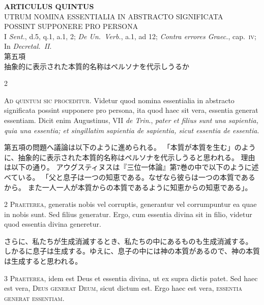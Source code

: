 \documentclass[paper=a4paper,fontsize=10pt,jafontsize=9pt,titlepage]{jlreq}
\begin{document}
\begin{center}
 {\Large {\bfseries ARTICULUS QUINTUS}}\\
 {\large UTRUM NOMINA ESSENTIALIA IN ABSTRACTO SIGNIFICATA\\POSSINT SUPPONERE PRO PERSONA}\\
 {\footnotesize I \textit{Sent.}, d.5, q.1, a.1, 2; \textit{De Un.~Verb.}, a.1, ad 12; \textit{Contra errores Graec.}, cap.~\textsc{iv}; In \textit{Decretal.~II}.}\\
 {\Large 第五項\\抽象的に表示された本質的名称はペルソナを代示しうるか}
\end{center}

\begin{paracol}{2}

\textsc{Ad quintum sic proceditur}. Videtur quod nomina essentialia in
abstracto significata possint supponere pro persona, ita quod haec sit vera,
essentia generat essentiam. Dicit enim Augustinus, VII \textit{de Trin}., \textit{pater et
filius sunt una sapientia, quia una essentia; et singillatim sapientia de
sapientia, sicut essentia de essentia}.

\switchcolumn

第五項の問題へ議論は以下のように進められる。
「本質が本質を生む」のように、抽象的に表示された本質的名称はペルソナを代示しうると思われる。
理由は以下の通り。
アウグスティヌスは『三位一体論』第7巻の中で以下のように述べている。
「父と息子は一つの知恵である。なぜなら彼らは一つの本質であるから。
また一人一人が本質からの本質であるように知恵からの知恵である」。

\switchcolumn*

2 \textsc{Praeterea}, generatis nobis vel corruptis, generantur vel
corrumpuntur ea quae in nobis sunt. Sed filius generatur. Ergo, cum essentia
divina sit in filio, videtur quod essentia divina generetur.

\switchcolumn

さらに、私たちが生成消滅するとき、私たちの中にあるものも生成消滅する。
しかるに息子は生成する。ゆえに、息子の中には神の本質があるので、神の本質は生成すると思われる。

\switchcolumn*

3 \textsc{Praeterea}, idem est Deus et essentia divina, ut ex supra dictis
patet. Sed haec est vera, \textsc{Deus generat Deum}, sicut dictum est. Ergo haec est
vera, \textsc{essentia generat essentiam}.

\switchcolumn


\end{paracol}
\end{document}
